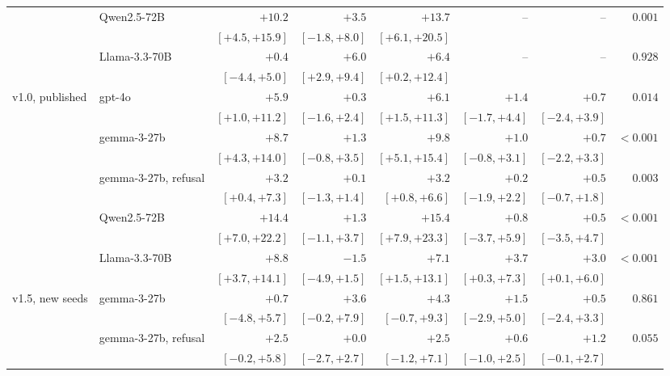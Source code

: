 \documentclass{article}
\begin{document}
\begin{table}[htbp]
{\begin{tabular}{llrrrrrr}
 & Qwen2.5-72B & $+10.2$ & $+3.5$ & $+13.7$ & -- & -- & $0.001$\\
 & & {\scriptsize$[+4.5,+15.9]$} & {\scriptsize$[-1.8,+8.0]$} & {\scriptsize$[+6.1,+20.5]$} &  &  & \\
 & Llama-3.3-70B & $+0.4$ & $+6.0$ & $+6.4$ & -- & -- & $0.928$\\
 & & {\scriptsize$[-4.4,+5.0]$} & {\scriptsize$[+2.9,+9.4]$} & {\scriptsize$[+0.2,+12.4]$} &  &  & \\
v1.0, published & gpt-4o & $+5.9$ & $+0.3$ & $+6.1$ & $+1.4$ & $+0.7$ & $0.014$\\
 & & {\scriptsize$[+1.0,+11.2]$} & {\scriptsize$[-1.6,+2.4]$} & {\scriptsize$[+1.5,+11.3]$} & {\scriptsize$[-1.7,+4.4]$} & {\scriptsize$[-2.4,+3.9]$} & \\
 & gemma-3-27b & $+8.7$ & $+1.3$ & $+9.8$ & $+1.0$ & $+0.7$ & $<0.001$\\
 & & {\scriptsize$[+4.3,+14.0]$} & {\scriptsize$[-0.8,+3.5]$} & {\scriptsize$[+5.1,+15.4]$} & {\scriptsize$[-0.8,+3.1]$} & {\scriptsize$[-2.2,+3.3]$} & \\
 & gemma-3-27b, refusal & $+3.2$ & $+0.1$ & $+3.2$ & $+0.2$ & $+0.5$ & $0.003$\\
 & & {\scriptsize$[+0.4,+7.3]$} & {\scriptsize$[-1.3,+1.4]$} & {\scriptsize$[+0.8,+6.6]$} & {\scriptsize$[-1.9,+2.2]$} & {\scriptsize$[-0.7,+1.8]$} & \\
 & Qwen2.5-72B & $+14.4$ & $+1.3$ & $+15.4$ & $+0.8$ & $+0.5$ & $<0.001$\\
 & & {\scriptsize$[+7.0,+22.2]$} & {\scriptsize$[-1.1,+3.7]$} & {\scriptsize$[+7.9,+23.3]$} & {\scriptsize$[-3.7,+5.9]$} & {\scriptsize$[-3.5,+4.7]$} & \\
 & Llama-3.3-70B & $+8.8$ & $-1.5$ & $+7.1$ & $+3.7$ & $+3.0$ & $<0.001$\\
 & & {\scriptsize$[+3.7,+14.1]$} & {\scriptsize$[-4.9,+1.5]$} & {\scriptsize$[+1.5,+13.1]$} & {\scriptsize$[+0.3,+7.3]$} & {\scriptsize$[+0.1,+6.0]$} & \\
v1.5, new seeds & gemma-3-27b & $+0.7$ & $+3.6$ & $+4.3$ & $+1.5$ & $+0.5$ & $0.861$\\
 & & {\scriptsize$[-4.8,+5.7]$} & {\scriptsize$[-0.2,+7.9]$} & {\scriptsize$[-0.7,+9.3]$} & {\scriptsize$[-2.9,+5.0]$} & {\scriptsize$[-2.4,+3.3]$} & \\
 & gemma-3-27b, refusal & $+2.5$ & $+0.0$ & $+2.5$ & $+0.6$ & $+1.2$ & $0.055$\\
 & & {\scriptsize$[-0.2,+5.8]$} & {\scriptsize$[-2.7,+2.7]$} & {\scriptsize$[-1.2,+7.1]$} & {\scriptsize$[-1.0,+2.5]$} & {\scriptsize$[-0.1,+2.7]$} & \\

\end{tabular}}
\end{table}
\end{document}
